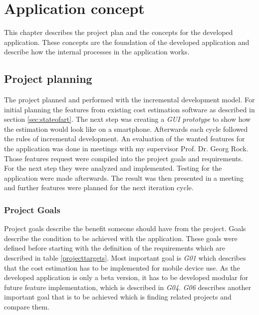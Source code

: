 \chapter{Application concept}

This chapter describes the project plan and the concepts for the developed application. These concepts are the foundation of the developed application and describe how the internal processes in the application works.


\section{Project planning}

The project planned and performed with the incremental development model. For initial planning the features from existing cost estimation software as described in section \ref{sec:stateofart}. The next step was creating a \textit{GUI prototype} to show how the estimation would look like on a smartphone. Afterwards each cycle followed the rules of incremental development. An evaluation of the wanted features for the application was done in meetings with my supervisor Prof. Dr. Georg Rock. Those features request were compiled into the project goals and requirements. For the next step they were analyzed and implemented. Testing for the application were made afterwards. The result was then presented in a meeting and further features were planned for the next iteration cycle.


\subsection{Project Goals}\label{objectives}

Project goals describe the benefit someone should have from the project. Goals describe the condition to be achieved with the application. These goals were defined before starting with the definition of the requirements which are described in table \ref{projecttargets}. Most important goal is \textit{G01} which describes that the cost estimation has to be implemented for mobile device use. As the developed application is only a beta version, it has to be developed modular for future feature implementation, which is described in \textit{G04}. \textit{G06} describes another important goal that is to be achieved which is finding related projects and compare them. \newpage

